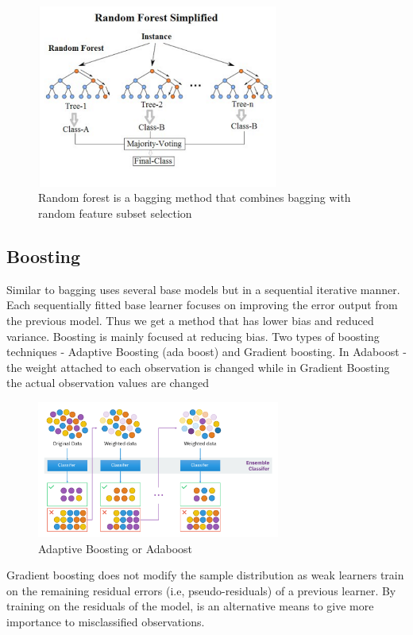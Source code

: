 \documentclass{article}
\begin{document}
\begin{figure}[H]
    \centering
    \includegraphics[width=8cm]{report-imgs/randomForest.png}
    \caption{Random forest is a bagging method that combines bagging with random feature subset selection \cite{randomForest}}
    \label{randomForest}
\end{figure}



\subsection{Boosting}


Similar to bagging uses several base models but in a sequential iterative manner. Each sequentially fitted base learner focuses on improving the error output from the previous model. Thus we get a method that has lower bias and reduced variance.
Boosting is mainly focused at reducing bias. Two types of boosting techniques - Adaptive Boosting (ada boost) and Gradient boosting.
In Adaboost - the weight attached to each observation is changed while in Gradient Boosting the actual observation values are changed

\begin{figure}[H]
    \centering
    \includegraphics[width=8cm]{report-imgs/adaboost.png}
    \caption{Adaptive Boosting or Adaboost \cite{wikiEnsemble}}
    \label{adaboost}
\end{figure}

Gradient boosting does not modify the sample distribution as weak learners train on the remaining residual errors  (i.e, pseudo-residuals) of a previous learner. By training on the residuals of the model, is an alternative means to give more importance to misclassified observations.
\end{document}

